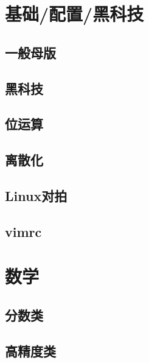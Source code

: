 \documentclass[10pt]{article}
\begin{document}
\tableofcontents
\newpage
\section{基础/配置/黑科技}
\subsection{一般母版}


\subsection{黑科技}


\subsection{位运算}


\subsection{离散化}


\subsection{Linux对拍}


\subsection{vimrc}

\section{数学}
\subsection{分数类}


\subsection{高精度类}

\end{document}
